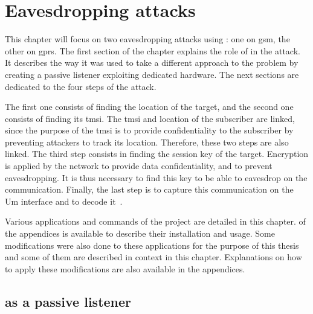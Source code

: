 \chapter{Eavesdropping attacks} \label{chap:eavesdropping_attacks}

\iffalse
    The whole attack could not be
    carried out, 
    
    Insist on the implementation and
    detailed explanation, this is the product. The whole attack could
    not be carried out. I think no publication shows how to do it and
    the only one was Munaut at 27C3. Really not trivial. try to explain
    the method and to give it a nice name. How i tried to solve the pb
    and implement the code
    \fi

    This chapter will focus on two eavesdropping attacks using
    : one on \gls{gsm}, the other on \gls{gprs}. The
    first section of the chapter explains the role of 
    in the attack. It describes the way it was used to take a different
    approach to the problem by creating a passive listener exploiting
    dedicated hardware. The next sections are dedicated to the four
    steps of the attack.

    The first one consists of finding the location of the target, and
    the second one consists of finding its \gls{tmsi}. The \gls{tmsi}
    and location of the subscriber are linked, since the purpose of the
    \gls{tmsi} is to provide confidentiality to the subscriber by
    preventing attackers to track its location. Therefore, these two
    steps are also linked. The third step consists in finding the
    session key of the target. Encryption is applied by the network to
    provide data confidentiality, and to prevent eavesdropping. It is
    thus necessary to find this key to be able to eavesdrop on the
    communication. Finally, the last step is to capture this
    communication on the Um interface and to decode
    it~\cite{3gpp_ts_2006}.

    Various applications and commands of the  project
    are detailed in this chapter.  of the appendices is
    available to describe their installation and usage. Some
    modifications were also done to these applications for the purpose
    of this thesis and some of them are described in context in this
    chapter. Explanations on how to apply these modifications are also
    available in the appendices.

  \section{ as a passive listener}
  \label{sec:passive_listener}

